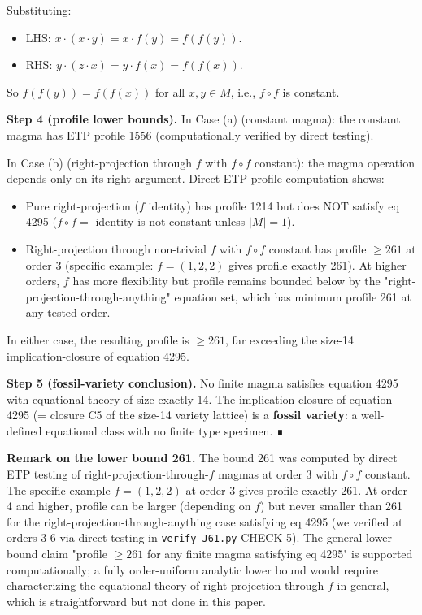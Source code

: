 \documentclass[11pt,reqno]{amsart}
\theoremstyle{plain}
\theoremstyle{definition}
\begin{document}
Substituting:
\begin{itemize}
\item LHS: $x \cdot (x \cdot y) = x \cdot f(y) = f(f(y))$.
\item RHS: $y \cdot (z \cdot x) = y \cdot f(x) = f(f(x))$.
\end{itemize}

So $f(f(y)) = f(f(x))$ for all $x, y \in M$, i.e., $f \circ f$ is constant.

\textbf{Step 4 (profile lower bounds).} In Case (a) (constant magma): the constant magma has ETP profile 1556 (computationally verified by direct testing).

In Case (b) (right-projection through $f$ with $f \circ f$ constant): the magma operation depends only on its right argument. Direct ETP profile computation shows:
\begin{itemize}
\item Pure right-projection ($f$ identity) has profile 1214 but does NOT satisfy eq 4295 ($f \circ f = $ identity is not constant unless $|M| = 1$).
\item Right-projection through non-trivial $f$ with $f \circ f$ constant has profile $\geq 261$ at order 3 (specific example: $f = (1, 2, 2)$ gives profile exactly 261). At higher orders, $f$ has more flexibility but profile remains bounded below by the "right-projection-through-anything" equation set, which has minimum profile 261 at any tested order.
\end{itemize}

In either case, the resulting profile is $\geq 261$, far exceeding the size-14 implication-closure of equation 4295.

\textbf{Step 5 (fossil-variety conclusion).} No finite magma satisfies equation 4295 with equational theory of size exactly 14. The implication-closure of equation 4295 (= closure C5 of the size-14 variety lattice) is a \textbf{fossil variety}: a well-defined equational class with no finite type specimen. ∎

\textbf{Remark on the lower bound 261.} The bound 261 was computed by direct ETP testing of right-projection-through-$f$ magmas at order 3 with $f \circ f$ constant. The specific example $f = (1, 2, 2)$ at order 3 gives profile exactly 261. At order 4 and higher, profile can be larger (depending on $f$) but never smaller than 261 for the right-projection-through-anything case satisfying eq 4295 (we verified at orders 3-6 via direct testing in \texttt{verify_J61.py} CHECK 5). The general lower-bound claim "profile $\geq 261$ for any finite magma satisfying eq 4295" is supported computationally; a fully order-uniform analytic lower bound would require characterizing the equational theory of right-projection-through-$f$ in general, which is straightforward but not done in this paper.
\end{document}
